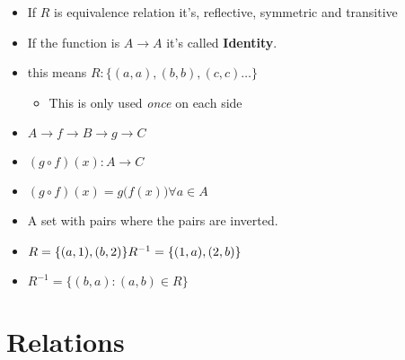 \documentclass[english,10pt,a4paper]{article}
\begin{document}
\begin{theo} 
\begin{itemize}
\item If $R$ is equivalence relation it's,  reflective, symmetric and transitive
\item If the function is $A \rightarrow A$ it's called \textbf{Identity}.
\item this means $R: \{ (a,a),(b,b), (c,c)\ldots\}$
\begin{itemize}
\item This is only used \textit{once} on each side
\end{itemize}
\end{itemize}
\end{theo}


\begin{theo}[Composition] 
\begin{itemize}
\item $A \rightarrow f \rightarrow B \rightarrow g \rightarrow C$
\item $(g \circ f)(x): A \rightarrow C$
\item $(g \circ f)(x) = g\big(f(x)\big) \forall a \in A$
\end{itemize}
\end{theo}


\begin{theo}
\begin{itemize}
\item A set with pairs where the pairs are inverted.
\item $R = \{(a,1), (b,2)\}\\
	R^{-1}=\{(1,a),(2,b)\}$
\item $R^{-1}=\{ (b,a):(a,b) \in R\}$
\end{itemize}
\end{theo}



\newpage
\section{Relations}
\end{document}
